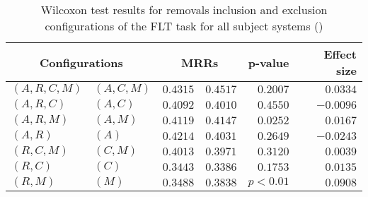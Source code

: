 
\begin{table}
\begin{spacing}{1.2}
\centering
\caption{Wilcoxon test results for removals inclusion and exclusion configurations of the FLT task for all subject systems (\ctwo)}
\label{table:versus-wilcox-all-flt-removals}
\begin{tabular}{ll|rr|rr}
\toprule
      \multicolumn{2}{c|}{Configurations} &                \multicolumn{2}{c|}{MRRs} &             p-value & Effect size \\
\midrule
 $(A,R,C,M)$ &  $(A,C,M)$ &       $0.4315$ &  $\bm{0.4517}$ & $0.2007$ &    $0.0334$ \\
   $(A,R,C)$ &    $(A,C)$ &  $\bm{0.4092}$ &       $0.4010$ & $0.4550$ &   $-0.0096$ \\
   $(A,R,M)$ &    $(A,M)$ &       $0.4119$ &  $\bm{0.4147}$ & $0.0252$ &    $0.0167$ \\
     $(A,R)$ &      $(A)$ &  $\bm{0.4214}$ &       $0.4031$ & $0.2649$ &   $-0.0243$ \\
   $(R,C,M)$ &    $(C,M)$ &  $\bm{0.4013}$ &       $0.3971$ & $0.3120$ &    $0.0039$ \\
     $(R,C)$ &      $(C)$ &  $\bm{0.3443}$ &       $0.3386$ & $0.1753$ &    $0.0135$ \\
     $(R,M)$ &      $(M)$ &       $0.3488$ &  $\bm{0.3838}$ & $p<0.01$ &    $0.0908$ \\
\bottomrule
\end{tabular}

\end{spacing}
\end{table}

